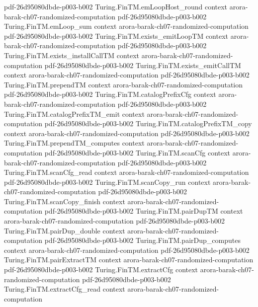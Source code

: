 \begin{theorem}
  {pdf-26d95080dbde-p003-b002}
\proofstep
  {Turing.FinTM.emLoopHost_round}
  {context}
  {arora-barak-ch07-randomized-computation}
  {pdf-26d95080dbde-p003-b002}
\proofstep
  {Turing.FinTM.emLoop_sum}
  {context}
  {arora-barak-ch07-randomized-computation}
  {pdf-26d95080dbde-p003-b002}
\proofstep
  {Turing.FinTM.exists_emitLoopTM}
  {context}
  {arora-barak-ch07-randomized-computation}
  {pdf-26d95080dbde-p003-b002}
\proofstep
  {Turing.FinTM.exists_installCallTM}
  {context}
  {arora-barak-ch07-randomized-computation}
  {pdf-26d95080dbde-p003-b002}
\proofstep
  {Turing.FinTM.exists_emitCallTM}
  {context}
  {arora-barak-ch07-randomized-computation}
  {pdf-26d95080dbde-p003-b002}
\proofstep
  {Turing.FinTM.prependTM}
  {context}
  {arora-barak-ch07-randomized-computation}
  {pdf-26d95080dbde-p003-b002}
\proofstep
  {Turing.FinTM.catalogPrefixCfg}
  {context}
  {arora-barak-ch07-randomized-computation}
  {pdf-26d95080dbde-p003-b002}
\proofstep
  {Turing.FinTM.catalogPrefixTM_emit}
  {context}
  {arora-barak-ch07-randomized-computation}
  {pdf-26d95080dbde-p003-b002}
\proofstep
  {Turing.FinTM.catalogPrefixTM_copy}
  {context}
  {arora-barak-ch07-randomized-computation}
  {pdf-26d95080dbde-p003-b002}
\proofstep
  {Turing.FinTM.prependTM_computes}
  {context}
  {arora-barak-ch07-randomized-computation}
  {pdf-26d95080dbde-p003-b002}
\proofstep
  {Turing.FinTM.scanCfg}
  {context}
  {arora-barak-ch07-randomized-computation}
  {pdf-26d95080dbde-p003-b002}
\proofstep
  {Turing.FinTM.scanCfg_read}
  {context}
  {arora-barak-ch07-randomized-computation}
  {pdf-26d95080dbde-p003-b002}
\proofstep
  {Turing.FinTM.scanCopy_run}
  {context}
  {arora-barak-ch07-randomized-computation}
  {pdf-26d95080dbde-p003-b002}
\proofstep
  {Turing.FinTM.scanCopy_finish}
  {context}
  {arora-barak-ch07-randomized-computation}
  {pdf-26d95080dbde-p003-b002}
\proofstep
  {Turing.FinTM.pairDupTM}
  {context}
  {arora-barak-ch07-randomized-computation}
  {pdf-26d95080dbde-p003-b002}
\proofstep
  {Turing.FinTM.pairDup_double}
  {context}
  {arora-barak-ch07-randomized-computation}
  {pdf-26d95080dbde-p003-b002}
\proofstep
  {Turing.FinTM.pairDup_computes}
  {context}
  {arora-barak-ch07-randomized-computation}
  {pdf-26d95080dbde-p003-b002}
\proofstep
  {Turing.FinTM.pairExtractTM}
  {context}
  {arora-barak-ch07-randomized-computation}
  {pdf-26d95080dbde-p003-b002}
\proofstep
  {Turing.FinTM.extractCfg}
  {context}
  {arora-barak-ch07-randomized-computation}
  {pdf-26d95080dbde-p003-b002}
\proofstep
  {Turing.FinTM.extractCfg_read}
  {context}
  {arora-barak-ch07-randomized-computation}

\end{theorem}
